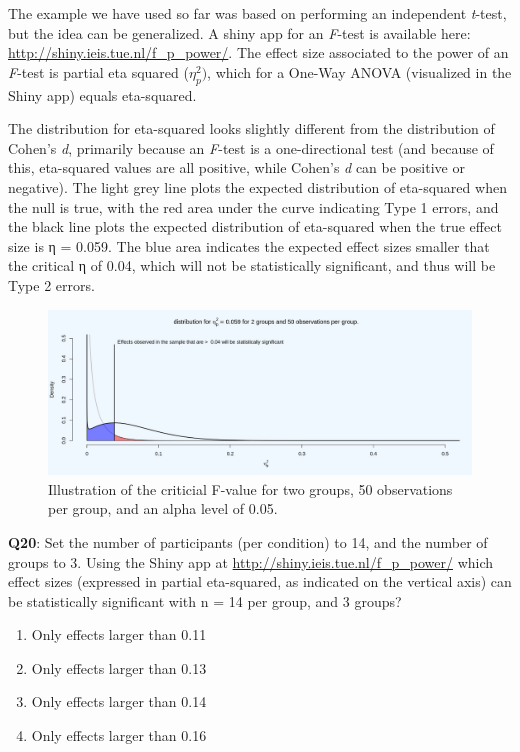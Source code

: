 \documentclass[
  oneside]{krantz}
\providecommand{\tightlist}{%
  \setlength{\itemsep}{0pt}\setlength{\parskip}{0pt}}
\begin{document}
The example we have used so far was based on performing an independent \emph{t}-test, but the idea can be generalized. A shiny app for an \emph{F}-test is available here: \url{http://shiny.ieis.tue.nl/f_p_power/}. The effect size associated to the power of an \emph{F}-test is partial eta squared (\(\eta_{p}^{2})\), which for a One-Way ANOVA (visualized in the Shiny app) equals eta-squared.

The distribution for eta-squared looks slightly different from the distribution of Cohen's \emph{d}, primarily because an \emph{F}-test is a one-directional test (and because of this, eta-squared values are all positive, while Cohen's \emph{d} can be positive or negative). The light grey line plots the expected distribution of eta-squared when the null is true, with the red area under the curve indicating Type 1 errors, and the black line plots the expected distribution of eta-squared when the true effect size is η = 0.059. The blue area indicates the expected effect sizes smaller that the critical η of 0.04, which will not be statistically significant, and thus will be Type 2 errors.



\begin{figure}

{\centering \includegraphics[width=1\linewidth]{images/7f6d17dc07bdc9e95ea8944d78b16d7c} 

}

\caption{Illustration of the criticial F-value for two groups, 50 observations per group, and an alpha level of 0.05.}\label{fig:critf}
\end{figure}

\textbf{Q20}: Set the number of participants (per condition) to 14, and the number of groups to 3. Using the Shiny app at \url{http://shiny.ieis.tue.nl/f_p_power/} which effect sizes (expressed in partial eta-squared, as indicated on the vertical axis) can be statistically significant with n = 14 per group, and 3 groups?

\begin{enumerate}
\def\labelenumi{\Alph{enumi})}
\tightlist
\item
  Only effects larger than 0.11
\item
  Only effects larger than 0.13
\item
  Only effects larger than 0.14
\item
  Only effects larger than 0.16
\end{enumerate}
\end{document}

